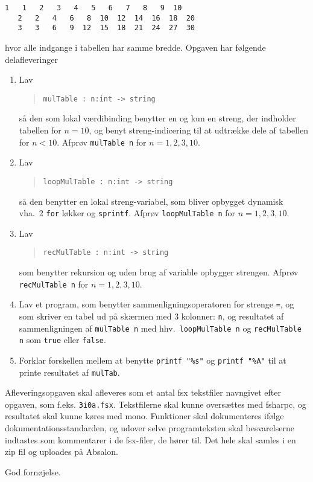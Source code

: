 \documentclass[a4paper,12pt]{article}
\begin{document}
\begin{enumerate}[label=3i.\arabic*,start=0]
\begin{lstlisting}[caption=Eksempel på brug og output fra \lstinline!mulTab!,label=mulTab]
   1   1   2   3   4   5   6   7   8   9  10
   2   2   4   6   8  10  12  14  16  18  20
   3   3   6   9  12  15  18  21  24  27  30
\end{lstlisting}
  hvor alle indgange i tabellen har samme bredde. Opgaven har følgende delafleveringer
  \begin{enumerate}
  \item Lav
    \begin{quote}
      \mbox{\lstinline!mulTable : n:int -> string!}
    \end{quote}
så den som lokal værdibinding benytter en og kun en streng, der indholder tabellen for $n=10$, og benyt streng-indicering til at udtrække dele af tabellen for $n<10$.  Afprøv \mbox{\lstinline!mulTable n!} for $n= 1, 2, 3, 10$.
  \item Lav
    \begin{quote}
      \mbox{\lstinline!loopMulTable : n:int -> string!}
    \end{quote}
så den benytter en lokal streng-variabel, som bliver opbygget dynamisk vha.\ 2 \lstinline!for! løkker og \lstinline!sprintf!.  Afprøv \mbox{\lstinline!loopMulTable n!} for $n= 1, 2, 3, 10$.
  \item Lav
    \begin{quote}
      \mbox{\lstinline!recMulTable : n:int -> string!}
    \end{quote}
som benytter rekursion og uden brug af variable opbygger strengen. Afprøv \mbox{\lstinline!recMulTable n!} for $n= 1, 2, 3, 10$.
  \item Lav et program, som benytter sammenligningsoperatoren for strenge \lstinline!=!, og som skriver en tabel ud på skærmen med 3 kolonner: \lstinline!n!, og resultatet af sammenligningen af \mbox{\lstinline!mulTable n!} med hhv.\ \mbox{\lstinline!loopMulTable n!} og \mbox{\lstinline!recMulTable n!} som \lstinline!true! eller \lstinline!false!.
  \item Forklar forskellen mellem at benytte \lstinline!printf "%s"! og \lstinline!printf "%A"! til at printe resultatet af \lstinline!mulTab!.
  \end{enumerate}
\end{enumerate}
Afleveringsopgaven skal afleveres som et antal fsx tekstfiler navngivet efter opgaven, som f.eks. \lstinline!3i0a.fsx!. Tekstfilerne skal kunne oversættes med fsharpc, og resultatet skal kunne køres med mono. Funktioner skal dokumenteres ifølge dokumentationsstandarden, og udover selve programteksten skal besvarelserne indtastes som kommentarer i de fsx-filer, de hører til. Det hele skal samles i en zip fil og uploades på Absalon.

\flushright God fornøjelse.
\end{document}
